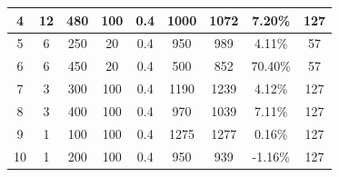 \documentclass{article}
\begin{document}
\begin{table}[!htp]
\begin{tabular}{@{}ccccccccc@{}}
4                              & 12                                             & 480                                      & 100                                                & 0.4                                                    & 1000             & 1072              & 7.20\%              & 127                                              \\ \midrule
5                              & 6                                              & 250                                      & 20                                                 & 0.4                                                    & 950              & 989               & 4.11\%              & 57                                               \\ \midrule
6                              & 6                                              & 450                                      & 20                                                 & 0.4                                                    & 500              & 852               & 70.40\%             & 57                                               \\ \midrule
7                              & 3                                              & 300                                      & 100                                                & 0.4                                                    & 1190             & 1239              & 4.12\%              & 127                                              \\ \midrule
8                              & 3                                              & 400                                      & 100                                                & 0.4                                                    & 970              & 1039              & 7.11\%              & 127                                              \\ \midrule
9                             & 1                                              & 100                                      & 100                                                & 0.4                                                    & 1275             & 1277              & 0.16\%              & 127                                              \\ \midrule
10                             & 1                                              & 200                                      & 100                                                & 0.4                                                    & 950              & 939               & -1.16\%             & 127                                              \\ \bottomrule
\end{tabular}
\end{table}
\end{document}

